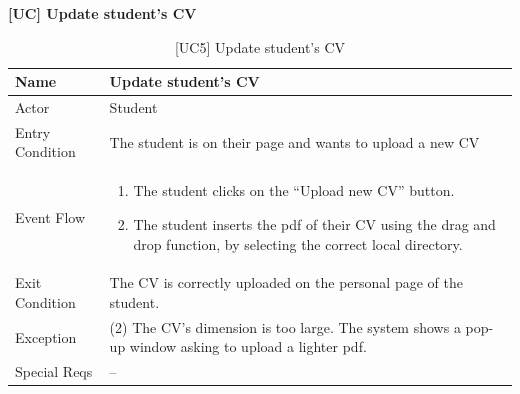 \textbf{[UC\nextUseCases] Update student’s CV}
\begin{table}[H] %
    \centering
    \begin{tabular}{|p{3cm}|p{10cm}|}
    \hline
    Name & Update student’s CV \\ \hline
    Actor  & Student \\ \hline
    Entry Condition  & The student is on their page and wants to upload a new CV \\ \hline
    Event Flow  & 
    \begin{enumerate}[noitemsep, topsep=0pt]
        \item The student clicks on the “Upload new CV” button.
        \item The student inserts the pdf of their CV using the drag and drop function, by selecting the correct local directory.
    \end{enumerate}
    \\ \hline
    Exit Condition  &  The CV is correctly uploaded on the personal page of the student. \\ \hline
    Exception  & (2) The CV’s dimension is too large. The system shows a pop-up window asking to upload a lighter pdf. \\ \hline
    Special Reqs  & -- \\ \hline
    \end{tabular}
    \caption{[UC5] Update student’s CV}
\end{table}

